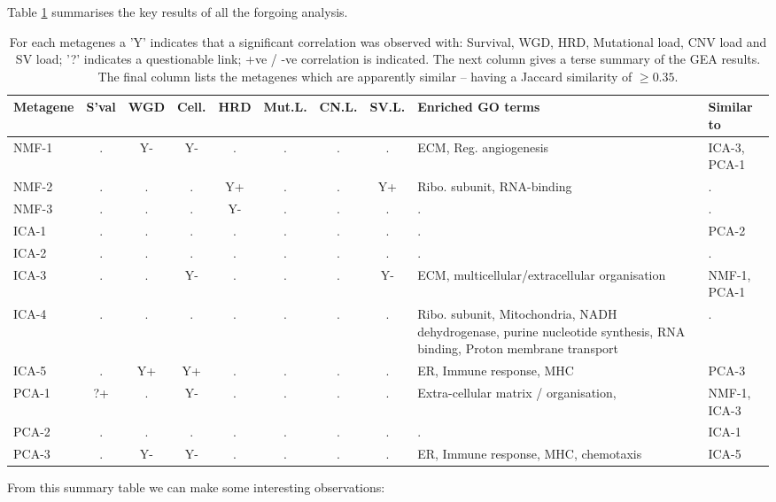 \documentclass[tikz, 11pt,a4paper,oneside,fleqn, draft]{article}
\begin{document}
Table \ref{tab-integrative-analysis} summarises the key results of all the forgoing analysis.  
 
\begin{table}[htb!]
\begin{center}
\begingroup
\scriptsize
\renewcommand{\arraystretch}{1.4} %
\begin{tabular}{|l||c|c|c|c|c|c|c|p{4.5cm}|l|}
\hline
Metagene & S'val & WGD & Cell. & HRD & Mut.L. & CN.L. & SV.L. & Enriched GO terms & Similar to\\
\hline
NMF-1 & . & Y-& Y-& . & . & . & . & ECM, Reg. angiogenesis & ICA-3, PCA-1 \\
NMF-2 & . & . & . & Y+& . & . & Y+& Ribo. subunit, RNA-binding & . \\
NMF-3 & . & . & . & Y-& . & . & . & . & . \\
\hline
ICA-1 & . & . & . & . & . & . & . & . & PCA-2 \\
ICA-2 & . & . & . & . & . & . & . & . & . \\
ICA-3 & . & . & Y-& . & . & . & Y-& ECM, multicellular/extracellular organisation & NMF-1, PCA-1 \\
ICA-4 & . & . & . & . & . & . & . & Ribo. subunit, Mitochondria, NADH dehydrogenase, purine nucleotide synthesis, RNA binding, Proton membrane transport & . \\
ICA-5 & . & Y+& Y+& . & . & . & . & ER, Immune response, MHC & PCA-3 \\
\hline
PCA-1 & ?+& . & Y-& . & . & . & . & Extra-cellular matrix / organisation, & NMF-1, ICA-3 \\
PCA-2 & . & . & . & . & . & . & . & . & ICA-1 \\
PCA-3 & . & Y-& Y-& . & . & . & . & ER, Immune response, MHC, chemotaxis & ICA-5 \\
\hline
\end{tabular}
\endgroup
\end{center}
\caption{For each metagenes a 'Y' indicates that a significant correlation was observed with: Survival, WGD, HRD, Mutational load,  CNV load and SV load;  '?' indicates a questionable link; +ve / -ve correlation is indicated.  The next column gives a terse summary of the GEA results.  The final column lists the metagenes which are apparently similar -- having a Jaccard similarity of $\geq 0.35$.}
\label{tab-integrative-analysis}
\end{table}
From this summary table we can make some interesting observations:
\end{document}
